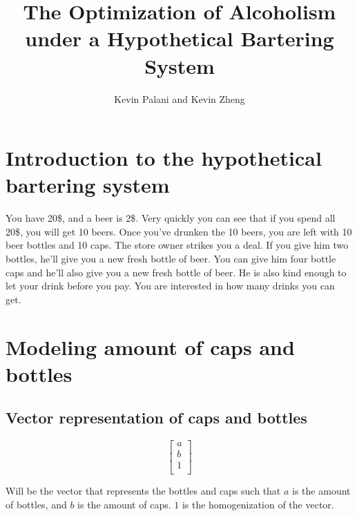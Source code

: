 \documentclass[letterpaper, 12pt]{article}
\title{The Optimization of Alcoholism under a Hypothetical Bartering System}
\author{Kevin Palani and Kevin Zheng}
\begin{document}
\maketitle
\section{Introduction to the hypothetical bartering system}
\par You have 20\$, and a beer is 2\$.
Very quickly you can see that if you spend all 20\$, you will get 10 beers.
Once you've drunken the 10 beers, you are left with 10 beer bottles and 10 caps.
The store owner strikes you a deal.
If you give him two bottles, he'll give you a new fresh bottle of beer.
You can give him four bottle caps and he'll also give you a new fresh bottle of beer.
He is also kind enough to let your drink before you pay.
You are interested in how many drinks you can get.
\section{Modeling amount of caps and bottles}
\subsection{Vector representation of caps and bottles}
\[
	\begin{bmatrix}
		a\\
		b\\
		1\\
	\end{bmatrix}
\]
\par Will be the vector that represents the bottles and caps such that $a$ is the amount of bottles, and $b$ is the amount of caps.
$1$ is the homogenization of the vector.
\end{document}
